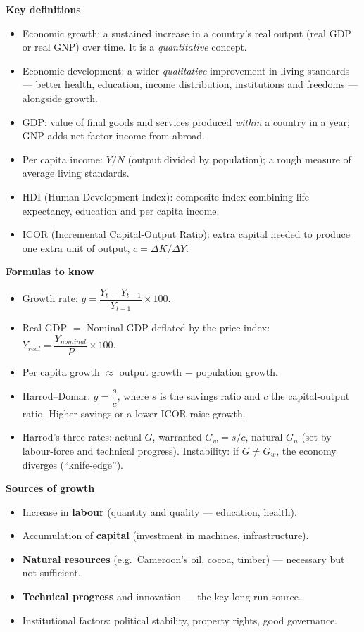 \documentclass[11pt]{article}
\newcommand{\cle}[1]{{\popxbold\color{popdark}#1}}
\begin{document}
\begin{bilan}
\textbf{Key definitions}\par
\begin{itemize}
\item \cle{Economic growth}: a sustained increase in a country's real output (real GDP or real GNP) over time. It is a \emph{quantitative} concept.
\item \cle{Economic development}: a wider \emph{qualitative} improvement in living standards — better health, education, income distribution, institutions and freedoms — alongside growth.
\item \cle{GDP}: value of final goods and services produced \emph{within} a country in a year; \cle{GNP} adds net factor income from abroad.
\item \cle{Per capita income}: $Y/N$ (output divided by population); a rough measure of average living standards.
\item \cle{HDI} (Human Development Index): composite index combining life expectancy, education and per capita income.
\item \cle{ICOR} (Incremental Capital-Output Ratio): extra capital needed to produce one extra unit of output, $c = \Delta K / \Delta Y$.
\end{itemize}

\textbf{Formulas to know}\par
\begin{itemize}
\item Growth rate: $g = \dfrac{Y_t - Y_{t-1}}{Y_{t-1}} \times 100$.
\item Real GDP $=$ Nominal GDP deflated by the price index: $Y_{real} = \dfrac{Y_{nominal}}{P}\times 100$.
\item Per capita growth $\approx$ output growth $-$ population growth.
\item \cle{Harrod--Domar}: $g = \dfrac{s}{c}$, where $s$ is the savings ratio and $c$ the capital-output ratio. Higher savings or a lower ICOR raise growth.
\item Harrod's three rates: actual $G$, warranted $G_w = s/c$, natural $G_n$ (set by labour-force and technical progress). Instability: if $G \neq G_w$, the economy diverges (``knife-edge'').
\end{itemize}

\textbf{Sources of growth}\par
\begin{itemize}
\item Increase in \textbf{labour} (quantity and quality — education, health).
\item Accumulation of \textbf{capital} (investment in machines, infrastructure).
\item \textbf{Natural resources} (e.g.\ Cameroon's oil, cocoa, timber) — necessary but not sufficient.
\item \textbf{Technical progress} and innovation — the key long-run source.
\item Institutional factors: political stability, property rights, good governance.
\end{itemize}


\end{bilan}
\end{document}
